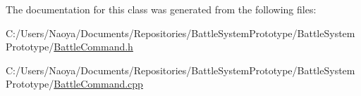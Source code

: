 The documentation for this class was generated from the following files\+:\begin{DoxyCompactItemize}
\item 
C\+:/\+Users/\+Naoya/\+Documents/\+Repositories/\+Battle\+System\+Prototype/\+Battle\+System\+Prototype/\hyperlink{_battle_command_8h}{Battle\+Command.\+h}\item 
C\+:/\+Users/\+Naoya/\+Documents/\+Repositories/\+Battle\+System\+Prototype/\+Battle\+System\+Prototype/\hyperlink{_battle_command_8cpp}{Battle\+Command.\+cpp}\end{DoxyCompactItemize}
